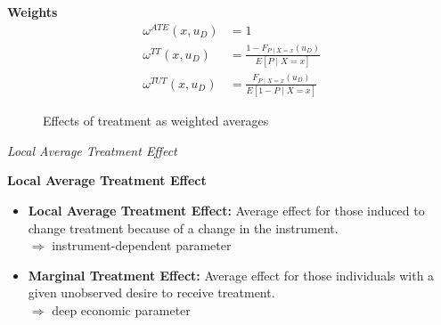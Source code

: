 \begin{frame}
	\textbf{Weights}
	\begin{align*}
		\omega^{ATE}(x, u_D) & = 1 \\
		\omega^{TT}(x, u_D) & = \frac{1 - F_{P\mid X=x}(u_D)}{E[P \mid X = x]}\\
		\omega^{TUT}(x, u_D) & = \frac{F_{P\mid X=x}(u_D)}{E[1 - P \mid X = x]}
	\end{align*}
\end{frame}
\begin{frame}
	\begin{figure}\caption{Effects of treatment as weighted averages}
	\end{figure}
\end{frame}
\begin{frame}\begin{center}
		\LARGE\textit{Local Average Treatment Effect}
\end{center}\end{frame}
\begin{frame}\textbf{Local Average Treatment Effect}\vspace{0.3cm}
	\begin{itemize}\setlength\itemsep{1em}
		\item \textbf{Local Average Treatment Effect:} Average effect for those induced
		to change treatment because of a change in the instrument.\\\vspace{0.2cm}
		\(\Rightarrow\) instrument-dependent parameter\vspace{0.4cm}

		\item \textbf{Marginal Treatment Effect:} Average effect for those individuals
		with a given unobserved desire to receive treatment.\\\vspace{0.2cm}
		\(\Rightarrow\) deep economic parameter
	\end{itemize}
\end{frame}
